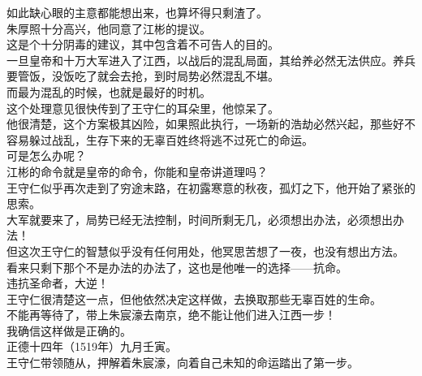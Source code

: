 \begin{multicols}{\theparacolNo}
如此缺心眼的主意都能想出来，也算坏得只剩渣了。\\

朱厚照十分高兴，他同意了江彬的提议。\\

这是个十分阴毒的建议，其中包含着不可告人的目的。\\

一旦皇帝和十万大军进入了江西，以战后的混乱局面，其给养必然无法供应。养兵要管饭，没饭吃了就会去抢，到时局势必然混乱不堪。\\

而最为混乱的时候，也就是最好的时机。\\

这个处理意见很快传到了王守仁的耳朵里，他惊呆了。\\

他很清楚，这个方案极其凶险，如果照此执行，一场新的浩劫必然兴起，那些好不容易躲过战乱，生存下来的无辜百姓终将逃不过死亡的命运。\\

可是怎么办呢？\\

江彬的命令就是皇帝的命令，你能和皇帝讲道理吗？\\

王守仁似乎再次走到了穷途末路，在初露寒意的秋夜，孤灯之下，他开始了紧张的思索。\\

大军就要来了，局势已经无法控制，时间所剩无几，必须想出办法，必须想出办法！\\

但这次王守仁的智慧似乎没有任何用处，他冥思苦想了一夜，也没有想出方法。\\

看来只剩下那个不是办法的办法了，这也是他唯一的选择——抗命。\\

违抗圣命者，大逆！\\

王守仁很清楚这一点，但他依然决定这样做，去换取那些无辜百姓的生命。\\

不能再等待了，带上朱宸濠去南京，绝不能让他们进入江西一步！\\

我确信这样做是正确的。\\

正德十四年（1519年）九月壬寅。\\

王守仁带领随从，押解着朱宸濠，向着自己未知的命运踏出了第一步。\\


\end{multicols}
